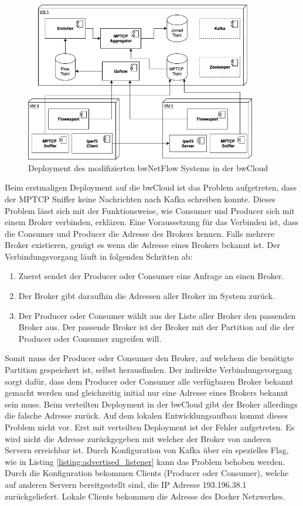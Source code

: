 \documentclass[a4paper, 12pt]{article}
\begin{document}
\begin{figure}[H]
    \centering
    \includegraphics[width=0.9\textwidth]{images/deployment_bwCloud.png}
    \caption{Deployment des modifizierten bwNetFlow Systems in der bwCloud}
    \label{fig:deployment_bwCloud}
\end{figure}

Beim erstmaligen Deployment auf die bwCloud ist das Problem aufgetreten, dass der MPTCP Sniffer keine Nachrichten nach Kafka schreiben konnte.
Dieses Problem lässt sich mit der Funktionsweise, wie Consumer und Producer sich mit einem Broker verbinden, erklären.
Eine Voraussetzung für das Verbinden ist, dass die Consumer und Producer die Adresse des Brokers kennen.
Falls mehrere Broker existieren, genügt es wenn die Adresse eines Brokers bekannt ist.
Der Verbindungsvorgang läuft in folgenden Schritten ab:
\begin{enumerate}
\item Zuerst sendet der Producer oder Consumer eine Anfrage an einen Broker.
\item Der Broker gibt daraufhin die Adressen aller Broker im System zurück.
\item Der Producer oder Consumer wählt aus der Liste aller Broker den passenden Broker aus. Der passende Broker ist der Broker mit der Partition auf die der Producer oder Consumer
zugreifen will.
\end{enumerate}
Somit muss der Producer oder Consumer den Broker, auf welchem die benötigte Partition gespeichert ist, selbst herausfinden.
Der indirekte Verbindungsvorgang sorgt dafür, dass dem Producer oder Consumer alle verfügbaren Broker bekannt gemacht werden und gleichzeitig initial nur eine Adresse eines Brokers bekannt sein muss. 
Beim verteilten Deployment in der bwCloud gibt der Broker allerdings die falsche Adresse zurück.
Auf dem lokalen Entwicklungsaufbau kommt dieses Problem nicht vor. Erst mit verteilten Deployment ist der Fehler aufgetreten.  
Es wird nicht die Adresse zurückgegeben mit welcher der Broker von anderen Servern erreichbar ist. 
Durch Konfiguration von Kafka über ein spezielles Flag, wie in Listing \ref{listing:advertised_listener} kann das Problem behoben werden.
Durch die Konfiguration bekommen Clients (Producer oder Consumer), welche auf anderen Servern bereitgestellt sind, die IP Adresse 193.196.38.1 zurückgeliefert. Lokale Clients bekommen die Adresse des Docker Netzwerkes.  
\end{document}
